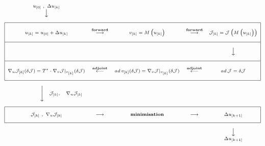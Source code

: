 \begin{eqnarray*}
\scriptsize
\begin{array}{ccccc}
u_{[0]} \,\, ,  \,\, \Delta u_{[k]}    & ~ & ~ & ~ & ~ \\
{\Big\downarrow} 
   & ~ & ~ & ~ & ~ \\
 ~ & ~ & ~ & ~ & ~ \\
\hline
\multicolumn{1}{|c}{~} & ~ & ~ & ~ & \multicolumn{1}{c|}{~} \\
\multicolumn{1}{|c}{
u_{[k]} = u_{[0]} + \Delta u_{[k]}} &
\stackrel{\bf forward}{\bf \longrightarrow} &
v_{[k]} = M \left( u_{[k]} \right) &
\stackrel{\bf forward}{\bf \longrightarrow} &
\multicolumn{1}{c|}{
{\cal J}_{[k]} = {\cal J} \left( M \left( u_{[k]} \right) \right)} \\
\multicolumn{1}{|c}{~} & ~ & ~ & ~ & \multicolumn{1}{c|}{~} \\
\hline
\multicolumn{1}{|c}{~} & ~ & ~ & ~ & \multicolumn{1}{c|}{~}  \\
\multicolumn{1}{|c}{~} & ~ & ~ & ~ & \multicolumn{1}{c|}{{\Big\downarrow}} \\
\multicolumn{1}{|c}{~} & ~ & ~ & ~ & \multicolumn{1}{c|}{~}  \\
\hline
\multicolumn{1}{|c}{~} & ~ & ~ & ~ & \multicolumn{1}{c|}{~} \\
\multicolumn{1}{|c}{
\nabla_u {\cal J}_{[k]} (\delta {\cal J}) = 
T^{\ast} \cdot \nabla_v {\cal J} |_{v_{[k]}} (\delta {\cal J})} &
\stackrel{\bf adjoint}{\mathbf \longleftarrow} &
ad \, v_{[k]} (\delta {\cal J}) = 
\nabla_v {\cal J} |_{v_{[k]}} (\delta {\cal J}) &
\stackrel{\bf adjoint}{\mathbf \longleftarrow} &
\multicolumn{1}{c|}{ ad \, {\cal J} = \delta {\cal J}} \\
\multicolumn{1}{|c}{~} & ~ & ~ & ~ & \multicolumn{1}{c|}{~} \\
\hline
 ~ & ~ & ~ & ~ & ~ \\
\hspace*{15ex}{\Bigg\downarrow}  
\quad {\cal J}_{[k]}, \quad \nabla_u {\cal J}_{[k]}
 & ~ & ~ & ~ & ~ \\
 ~ & ~ & ~ & ~ & ~ \\
\hline
\multicolumn{1}{|c}{~} & ~ & ~ & ~ & \multicolumn{1}{c|}{~} \\
\multicolumn{1}{|c}{
{\cal J}_{[k]} \,\, ,  \,\, \nabla_u {\cal J}_{[k]}} &
{\mathbf \longrightarrow} & \text{\bf minimisation} &
{\mathbf \longrightarrow} & 
\multicolumn{1}{c|}{ \Delta u_{[k+1]}} \\
\multicolumn{1}{|c}{~} & ~ & ~ & ~ & \multicolumn{1}{c|}{~} \\
\hline
 ~ & ~ & ~ & ~ & ~ \\
 ~ & ~ & ~ & ~ & \Big\downarrow \\
 ~ & ~ & ~ & ~ & \Delta u_{[k+1]} \\
\end{array}
\end{eqnarray*}

